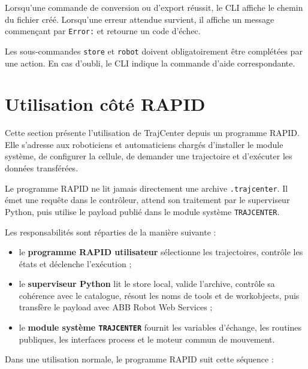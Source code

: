 \documentclass{rapportENSAM}
\begin{document}
Lorsqu'une commande de conversion ou d'export réussit, le CLI affiche le chemin du fichier créé. Lorsqu'une erreur attendue survient, il affiche un message commençant par \texttt{Error:} et retourne un code d'échec.

Les sous-commandes \texttt{store} et \texttt{robot} doivent obligatoirement être complétées par une action. En cas d'oubli, le CLI indique la commande d'aide correspondante.

\section{Utilisation côté RAPID}
\label{sec:rapid-usage}

Cette section présente l'utilisation de TrajCenter depuis un programme RAPID.
Elle s'adresse aux roboticiens et automaticiens chargés d'installer le module
système, de configurer la cellule, de demander une trajectoire et d'exécuter
les données transférées.

Le programme RAPID ne lit jamais directement une archive
\texttt{.trajcenter}. Il émet une requête dans le contrôleur, attend son
traitement par le superviseur Python, puis utilise le payload publié dans le
module système \texttt{TRAJCENTER}.

Les responsabilités sont réparties de la manière suivante :

\begin{itemize}
    \item le \textbf{programme RAPID utilisateur} sélectionne les trajectoires,
    contrôle les états et déclenche l'exécution ;
    \item le \textbf{superviseur Python} lit le store local, valide l'archive,
    contrôle sa cohérence avec le catalogue, résout les noms de tools et de
    workobjects, puis transfère le payload avec ABB Robot Web Services ;
    \item le \textbf{module système \texttt{TRAJCENTER}} fournit les variables
    d'échange, les routines publiques, les interfaces process et le moteur
    commun de mouvement.
\end{itemize}

Dans une utilisation normale, le programme RAPID suit cette séquence :
\end{document}
